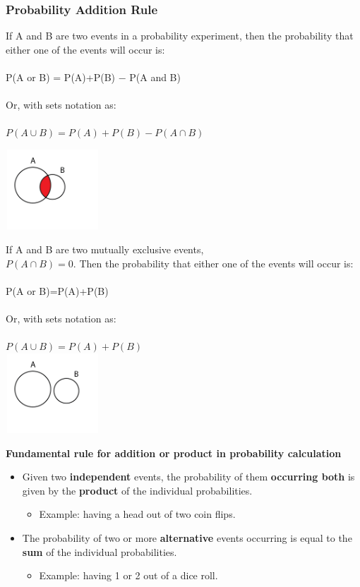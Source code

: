 \documentclass{article}
\begin{document}
\subsubsection{Probability Addition Rule}
If A and B are two events in a probability experiment, then the probability that either one of the events will occur is: \\ 
\mbox{} \\
P(A or B) = P(A)+P(B) − P(A and B) \\ 
\mbox{} \\
Or, with sets notation as: \\ 
\mbox{} \\
$P(A \cup B) = P(A)+P(B)−P(A \cap B)$ 

\includegraphics[width=3.5cm, height=3cm]{intersection}

If A and B are two mutually exclusive events, \\ 
$P(A \cap B) = 0$. Then the probability that either one of the events will occur is: \\
\mbox{} \\
P(A or B)=P(A)+P(B) \\
\mbox{} \\
Or, with sets notation as: \\ 
\mbox{} \\
$P(A \cup B)=P(A) + P(B)$ \\ 

\includegraphics[width=3.5cm, height=3cm]{independent}

\textbf{Fundamental rule for addition or product in probability calculation} \\

\begin{itemize}
    \item Given two \textbf{independent} events, the probability of them \textbf{occurring both} is given by the \textbf{product} of the individual probabilities. 
    \begin{itemize}
        \item Example: having a head out of two coin flips.
    \end{itemize}
    \item The probability of two or more \textbf{alternative} events occurring is equal to the \textbf{sum} of the individual probabilities. 
    \begin{itemize}
        \item Example: having 1 or 2 out of a dice roll.
    \end{itemize}
\end{itemize}
\end{document}
